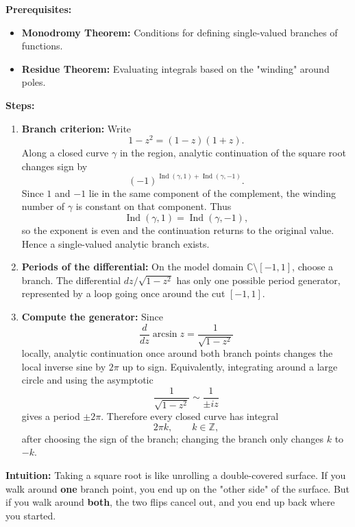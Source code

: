 \begin{solution}
\textbf{Prerequisites:}
\begin{itemize}
    \item \textbf{Monodromy Theorem:} Conditions for defining single-valued branches of functions.
    \item \textbf{Residue Theorem:} Evaluating integrals based on the "winding" around poles.
\end{itemize}

\textbf{Steps:}
\begin{enumerate}
    \item \textbf{Branch criterion:} Write
    \[
    1-z^2=(1-z)(1+z).
    \]
    Along a closed curve $\gamma$ in the region, analytic continuation of the square root changes sign by
    \[
    (-1)^{\operatorname{Ind}(\gamma,1)+\operatorname{Ind}(\gamma,-1)}.
    \]
    Since $1$ and $-1$ lie in the same component of the complement, the winding number of $\gamma$ is constant on that component. Thus
    \[
    \operatorname{Ind}(\gamma,1)=\operatorname{Ind}(\gamma,-1),
    \]
    so the exponent is even and the continuation returns to the original value. Hence a single-valued analytic branch exists.
    \item \textbf{Periods of the differential:} On the model domain $\mathbb{C}\setminus[-1,1]$, choose a branch. The differential $dz/\sqrt{1-z^2}$ has only one possible period generator, represented by a loop going once around the cut $[-1,1]$.
    \item \textbf{Compute the generator:} Since
    \[
    \frac{d}{dz}\arcsin z=\frac{1}{\sqrt{1-z^2}}
    \]
    locally, analytic continuation once around both branch points changes the local inverse sine by $2\pi$ up to sign. Equivalently, integrating around a large circle and using the asymptotic
    \[
    \frac{1}{\sqrt{1-z^2}}\sim \frac{1}{\pm iz}
    \]
    gives a period $\pm 2\pi$. Therefore every closed curve has integral
    \[
    2\pi k,\qquad k\in\mathbb{Z},
    \]
    after choosing the sign of the branch; changing the branch only changes $k$ to $-k$.
\end{enumerate}

\textbf{Intuition:}
Taking a square root is like unrolling a double-covered surface. If you walk around \textbf{one} branch point, you end up on the "other side" of the surface. But if you walk around \textbf{both}, the two flips cancel out, and you end up back where you started.
\end{solution}

